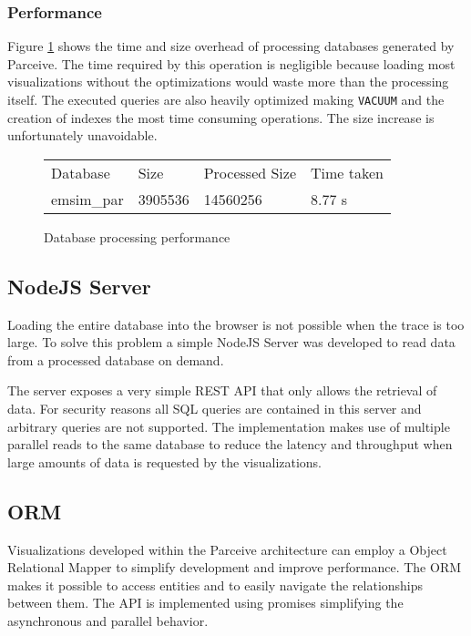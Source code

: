 \documentclass[conference]{IEEEtran}
\begin{document}
\subsubsection*{Performance}

Figure \ref{parceive:procperformance} shows the time and size overhead of processing databases generated by Parceive. The time required by this operation is negligible because loading most visualizations without the optimizations would waste more than the processing itself. The executed queries are also heavily optimized making \texttt{VACUUM} and the creation of indexes the most time consuming operations. The size increase is unfortunately unavoidable.

\begin{figure}
	\centering
	\begin{tabular}{l l l l}
		Database & Size & Processed Size & Time taken \\
		emsim\_par & 3905536 & 14560256 & 8.77 s
	\end{tabular}
	\caption{Database processing performance}
	\label{parceive:procperformance}
\end{figure}

\subsection{NodeJS Server}

Loading the entire database into the browser is not possible when the trace is too large. To solve this problem a simple NodeJS Server was developed to read data from a processed database on demand.

The server exposes a very simple REST \cite{rest} API that only allows the retrieval of data. For security reasons all SQL queries are contained in this server and  arbitrary queries are not supported. The implementation makes use of multiple parallel reads to the same database to reduce the latency and throughput when large amounts of data is requested by the visualizations.

\subsection{ORM}

Visualizations developed within the Parceive architecture can employ a Object Relational Mapper to simplify development and improve performance. The ORM makes it possible to access entities and to easily navigate the relationships between them. The API is implemented using promises \cite{promises} simplifying the asynchronous and parallel behavior.
\end{document}
